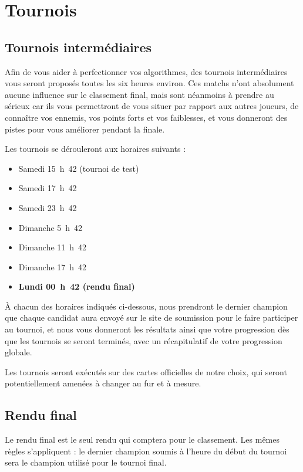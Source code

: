 \section{Tournois}

\subsection{Tournois intermédiaires}

Afin de vous aider à perfectionner vos algorithmes, des tournois intermédiaires
vous seront proposés toutes les six heures environ. Ces matchs n'ont absolument
aucune influence sur le classement final, mais sont néanmoins à prendre au
sérieux car ils vous permettront de vous situer par rapport aux autres
joueurs, de connaître vos ennemis, vos points forts et vos faiblesses, et vous
donneront des pistes pour vous améliorer pendant la finale.

Les tournois se dérouleront aux horaires suivants :

\begin{itemize}
    \item Samedi 15~h~42 (tournoi de test)
    \item Samedi 17~h~42
    \item Samedi 23~h~42
    \item Dimanche 5~h~42
    \item Dimanche 11~h~42
    \item Dimanche 17~h~42
    \item \textbf{Lundi 00~h~42 (rendu final)}
\end{itemize}

À chacun des horaires indiqués ci-dessous, nous prendront le dernier champion
que chaque candidat aura envoyé sur le site de soumission pour le faire
participer au tournoi, et nous vous donneront les résultats ainsi que votre
progression dès que les tournois se seront terminés, avec un récapitulatif
de votre progression globale.

Les tournois seront exécutés sur des cartes officielles de notre choix, qui
seront potentiellement amenées à changer au fur et à mesure.

\subsection{Rendu final}

Le rendu final est le seul rendu qui comptera pour le classement. Les mêmes
règles s'appliquent : le dernier champion soumis à l'heure du début du tournoi
sera le champion utilisé pour le tournoi final.

